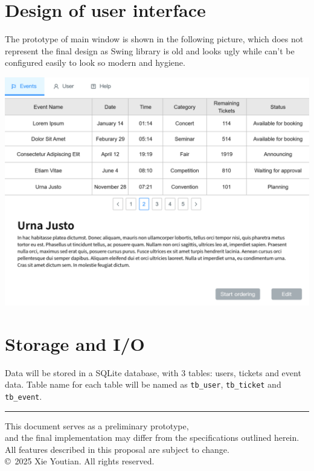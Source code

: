 \documentclass{article}
\begin{document}
\pagebreak

\section{Design of user interface}
The prototype of main window is shown in the following picture, which does not represent the final design as Swing library is old and looks ugly while can't be configured easily to look so modern and hygiene.

\includegraphics[width=\textwidth]{Main Window.pdf}
\section{Storage and I/O}
Data will be stored in a SQLite database, with 3 tables: users, tickets and event data. Table name for each table will be named as \verb|tb_user|, \verb|tb_ticket| and \verb|tb_event|.
\\
\hrule

\begin{center}
    This document serves as a preliminary prototype, \\ and the final implementation may differ from the specifications outlined herein.\\
    All features described in this proposal are subject to change.\\
    \copyright\ 2025 Xie Youtian. All rights reserved.
\end{center}
\end{document}
